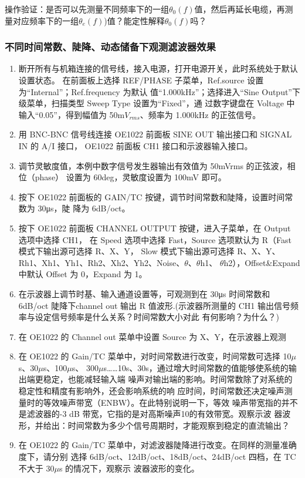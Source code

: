 \documentclass[11pt,a4paper]{ctexart}
\begin{document}
\begin{enumerate}[(1)]
\begin{table}[H]
\begin{tabular}{|  p{2cm} | p{2cm} | p{2cm} | p{2cm} |}
			\end{tabular}
		\end{table}
		操作验证：是否可以先测量不同频率下的一组$\theta_0(f)$值，然后再延长电缆，再测量对应频率下的一组$\theta_e(f)$)值？能定性解释$\theta_0(f)$吗？
\end{enumerate}
		\subsubsection{不同时间常数、陡降、动态储备下观测滤波器效果}
		\begin{enumerate}[(1)]
		\item 断开所有与机箱连接的信号线，接入电源，打开电源开关，此时系统处于默认设置状态。
		在前面板上选择 REF/PHASE 子菜单，Ref.source 设置为“Internal”；Ref.frequency 为默认
		值“1.000kHz”；选择进入“Sine Output”下级菜单，扫描类型 Sweep Type 设置为“Fixed”，通
		过数字键盘在 Voltage 中输入“0.05”，得到幅值为 50m$V_{rms}$、频率为 1.000kHz 的正弦信号。
		\item 用 BNC-BNC 信号线连接 OE1022 前面板 SINE OUT 输出接口和 SIGNAL IN 的 A/I 接口，
		OE1022 前面板 CH1 接口和示波器输入接口。
		\item 调节灵敏度值，本例中数字信号发生器输出有效值为 50mVrms 的正弦波，相位（phase）
		设置为 60deg，灵敏度设置为 100mV 即可。
		\item 按下 OE1022 前面板的 GAIN/TC 按键，调节时间常数和陡降，设置时间常数为 30μs，陡
		降为 6dB/oct。
		\item 按下 OE1022 前面板 CHANNEL OUTPUT 按键，进入子菜单，在 Output 选项中选择 CH1， 在 Speed 选项中选择 Fast，Source 选项默认为 R（Fast 模式下输出源可选择 R、X、Y，
		Slow 模式下输出源可选择 R、X、Y、Rh1、Xh1、Yh1、Rh2、Xh2、Yh2、Noise、$\theta$、$\theta$h1、 $\theta$h2），Offset\&Expand 中默认 Offset 为 0，Expand 为 1。
		\item 在示波器上调节时基、输入通道设置等，可观测到在 30μs 时间常数和 6dB/oct 陡降下channel out 输出 R 值波形.(示波器所测量的 CH1 输出信号频率与设定信号频率是什么关系？时间常数大小对此
		有何影响？为什么？)
		
		\item 在 OE1022 的 Channel out 菜单中设置 Source 为 X、Y，在示波器上观测
		
		\item 在 OE1022 的 Gain/TC 菜单中，对时间常数进行改变，时间常数可选择 10$\mu$s、30$\mu$s、100$\mu$s、
		300$\mu$s……10s、30s，通过增大时间常数的值能够使系统的输出端更稳定，也能减轻输入端
		噪声对输出端的影响。时间常数除了对系统的稳定性和精度有影响外，还会影响系统的响
		应时间，时间常数还决定噪声测量时的等效噪声带宽（ENBW）。在此特别说明一下，等效
		噪声带宽指的并不是滤波器的-3 dB 带宽，它指的是对高斯噪声10的有效带宽。观察示波
		器波形，并给出：时间常数为多少个信号周期时，才能观察到稳定的直流输出？
		
		\item 在 OE1022 的 Gain/TC 菜单中，对滤波器陡降进行改变。在同样的测量准确度下，请分别
		选择 6dB/oct、12dB/oct、18dB/oct、24dB/oct 四档，在 TC 不大于 30$\mu$s 的情况下，观察示
		波器波形的变化。
\end{enumerate}
\end{document}
